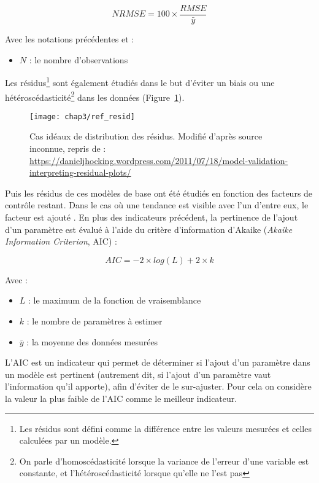 $$ NRMSE = 100 \times \frac{RMSE}{\bar{y}} $$

Avec les notations précédentes et : 
\begin{itemize}
\item $N$ : le nombre d'observations
\end{itemize}
Les résidus\footnote{Les résidus sont défini comme la différence entre les valeurs mesurées et celles calculées par un modèle.} sont également étudiés dans le but d'éviter un biais ou une hétéroscédasticité\footnote{On parle d'homoscédasticité lorsque la variance de l'erreur d'une variable est constante, et l'hétéroscédasticité lorsque qu'elle ne l'est pas} dans les données (Figure~\ref{fig:ref_resid}).

\begin{figure}[!htb]
\centering
\texttt{[image: chap3/ref\_resid]}
\caption{Cas idéaux de distribution des résidus. Modifié d'après source inconnue, repris de : \url{https://danieljhocking.wordpress.com/2011/07/18/model-validation-interpreting-residual-plots/}}
\label{fig:ref_resid}
\end{figure}

Puis les résidus de ces modèles de base ont été étudiés en fonction des facteurs de contrôle restant.
Dans le cas où une tendance est visible avec l'un d'entre eux, le facteur est ajouté \citep{bortoluzzi2006a}.
En plus des indicateurs précédent, la pertinence de l'ajout d'un paramètre est évalué à l'aide du  critère d'information d'Akaike (\textit{Akaike Information Criterion}, AIC) \citep{akaike1974,burnham2002} :

$$ AIC = -2 \times log(L) + 2\times k $$ 

Avec :
\begin{itemize}
\item $L$ : le maximum de la fonction de vraisemblance
\item $k$ : le nombre de paramètres à estimer
\item $\bar{y}$ : la moyenne des données mesurées
\end{itemize}

L'AIC est un indicateur qui permet de déterminer si l'ajout d'un paramètre dans un modèle est pertinent (autrement dit, si l'ajout d'un paramètre vaut l'information qu'il apporte), afin d'éviter de le sur-ajuster.
Pour cela on considère la valeur la plus faible de l'AIC comme le meilleur indicateur.


